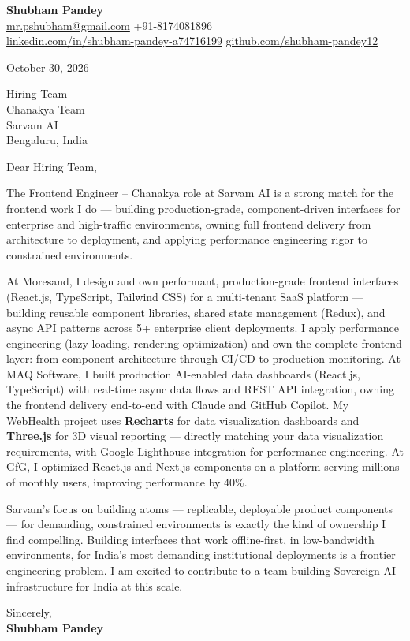 \documentclass[a4paper,11pt]{article}
\begin{document}
\textbf{\Large Shubham Pandey}\\
\href{mailto:mr.pshubham@gmail.com}{mr.pshubham@gmail.com} \quad +91-8174081896\\
\href{https://www.linkedin.com/in/shubham-pandey-a74716199/}{linkedin.com/in/shubham-pandey-a74716199} \quad
\href{https://github.com/shubham-pandey12}{github.com/shubham-pandey12}

\vspace{1em}
October 30, 2026

\vspace{1em}
Hiring Team\\
Chanakya Team\\
Sarvam AI\\
Bengaluru, India

\vspace{1em}
Dear Hiring Team,

The Frontend Engineer -- Chanakya role at Sarvam AI is a strong match for the frontend work I do --- building production-grade, component-driven interfaces for enterprise and high-traffic environments, owning full frontend delivery from architecture to deployment, and applying performance engineering rigor to constrained environments.

At Moresand, I design and own performant, production-grade frontend interfaces (React.js, TypeScript, Tailwind CSS) for a multi-tenant SaaS platform --- building reusable component libraries, shared state management (Redux), and async API patterns across 5+ enterprise client deployments. I apply performance engineering (lazy loading, rendering optimization) and own the complete frontend layer: from component architecture through CI/CD to production monitoring. At MAQ Software, I built production AI-enabled data dashboards (React.js, TypeScript) with real-time async data flows and REST API integration, owning the frontend delivery end-to-end with Claude and GitHub Copilot. My WebHealth project uses \textbf{Recharts} for data visualization dashboards and \textbf{Three.js} for 3D visual reporting --- directly matching your data visualization requirements, with Google Lighthouse integration for performance engineering. At GfG, I optimized React.js and Next.js components on a platform serving millions of monthly users, improving performance by 40\%.

Sarvam's focus on building atoms --- replicable, deployable product components --- for demanding, constrained environments is exactly the kind of ownership I find compelling. Building interfaces that work offline-first, in low-bandwidth environments, for India's most demanding institutional deployments is a frontier engineering problem. I am excited to contribute to a team building Sovereign AI infrastructure for India at this scale.

\vspace{1em}
Sincerely,\\[0.5em]
\textbf{Shubham Pandey}
\end{document}
